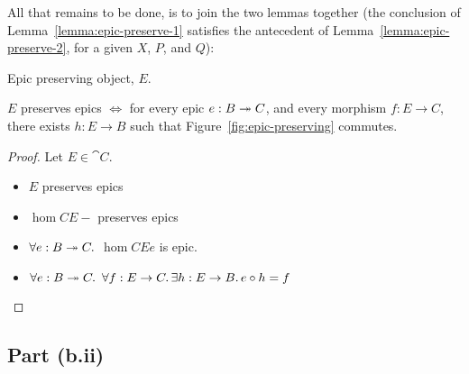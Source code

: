 All that remains to be done, is to join the two lemmas together (the conclusion of Lemma~\ref{lemma:epic-preserve-1} satisfies the antecedent of Lemma~\ref{lemma:epic-preserve-2}, for a given $X$, $P$, and $Q$):

\begin{marginfigure}
  \caption{Epic preserving object, $E$.}\label{fig:epic-preserving}
\end{marginfigure}

\begin{prop}\label{prop:epic-preserving}
  $E$ preserves epics $\iff$ for every epic $e : B \twoheadrightarrow C$, and every morphism $f : E \to C$, there exists $h : E \to B$ such that Figure~\ref{fig:epic-preserving} commutes.

  \begin{proof}
    Let $E\in\cat{C}$.
    \begin{itemize}
      \item[\phs]
        $E$ preserves epics
        \marginnote{\Hyp}

      \item[\iffs]
        $\hom{C}{E}{-}$ preserves epics

      \item[\iffs]
        $\forall e : B \twoheadrightarrow C\ldotp$ $\hom{C}{E}{e}$ is epic.

      \item[\iffs]
        $\forall e : B\twoheadrightarrow C\ldotp~\forall f : E \to C\ldotp\exists h : E \to B\ldotp e\circ h = f$
        \qedhere
        \marginnote{\Lemma-\ref{lemma:epic-preserve-2}-(\Lemma-\ref{lemma:epic-preserve-1})}
    \end{itemize}
  \end{proof}
\end{prop}

\subsection{Part (b.ii)}\label{sec:q-1-b-ii}

